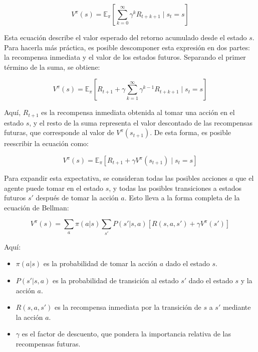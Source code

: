 \documentclass[a4paper,12pt, twoside]{report}
\begin{document}
\begin{equation}
V^\pi(s) = \mathbb{E}_\pi \left[ \sum_{k=0}^{\infty} \gamma^k R_{t+k+1} \mid s_t = s \right]
\end{equation}

Esta ecuación describe el valor esperado del retorno acumulado desde el estado \(s\). 
Para hacerla más práctica, es posible descomponer esta expresión en dos partes: la 
recompensa inmediata y el valor de los estados futuros. Separando el primer término de 
la suma, se obtiene:

\begin{equation}
V^\pi(s) = \mathbb{E}_\pi \left[ R_{t+1} + \gamma \sum_{k=1}^{\infty} \gamma^{k-1} R_{t+k+1} \mid s_t = s \right]
\end{equation}

Aquí, \(R_{t+1}\) es la recompensa inmediata obtenida al tomar una acción en el estado \(s\), 
y el resto de la suma representa el valor descontado de las recompensas futuras, que 
corresponde al valor de \(V^\pi(s_{t+1})\). De esta forma, es posible reescribir la ecuación como:

\begin{equation}
V^\pi(s) = \mathbb{E}_\pi \left[ R_{t+1} + \gamma V^\pi(s_{t+1}) \mid s_t = s \right]
\end{equation}

Para expandir esta expectativa, se consideran todas las posibles acciones \(a\) que el agente 
puede tomar en el estado \(s\), y todas las posibles transiciones a estados futuros \(s'\) 
después de tomar la acción \(a\). Esto lleva a la forma completa de la ecuación de Bellman:

\begin{equation}
V^\pi(s) = \sum_{a} \pi(a|s) \sum_{s'} P(s'|s,a) \left[ R(s,a,s') + \gamma V^\pi(s') \right]
\end{equation}

Aquí:
\begin{itemize}
    \item \(\pi(a|s)\) es la probabilidad de tomar la acción \(a\) dado el estado \(s\).
    \item \(P(s'|s,a)\) es la probabilidad de transición al estado \(s'\) dado el estado \(s\) y la acción \(a\).
    \item \(R(s,a,s')\) es la recompensa inmediata por la transición de \(s\) a \(s'\) mediante la acción \(a\).
    \item \(\gamma\) es el factor de descuento, que pondera la importancia relativa de las recompensas futuras.
\end{itemize}
\end{document}
